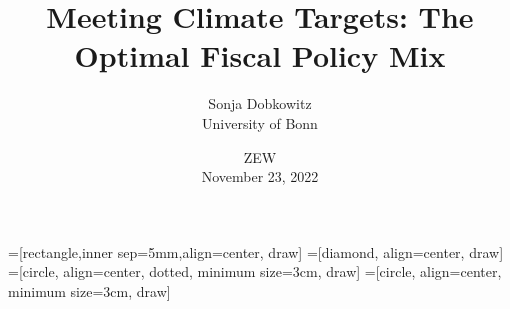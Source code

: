 \documentclass[11pt,aspectratio=169]{beamer}
\author[Sonja Dobkowitz]{\small Sonja Dobkowitz\\ \footnotesize{University of Bonn%
}\\ }
\title{Meeting Climate Targets: The Optimal Fiscal Policy Mix}
\date{\small{ZEW\\ November 23, 2022 }}
\begin{document}
=[rectangle,inner sep=5mm,align=center, draw]
=[diamond, align=center, draw]
=[circle, align=center, dotted, minimum size=3cm, draw]
=[circle, align=center, minimum size=3cm, draw]
{
	\begin{frame}
		\titlepage
	\end{frame}
}




%	
\end{document}
